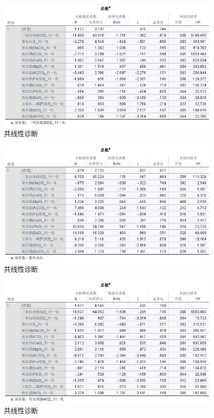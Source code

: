 \documentclass[UTF8]{ctexart}
\begin{document}
\begin{figure}[H]\centering
    \includegraphics[width=1\textwidth,height=0.6\textwidth]{img/1 (9).png} %
    \caption{共线性诊断} %
\end{figure}
\begin{figure}[H]\centering
    \includegraphics[width=1\textwidth,height=0.6\textwidth]{img/1 (10).png} %
    \caption{共线性诊断} %
\end{figure}
\begin{figure}[H]\centering
    \includegraphics[width=1\textwidth,height=0.6\textwidth]{img/1 (11).png} %
    \caption{共线性诊断} %
\end{figure}
\end{document}
